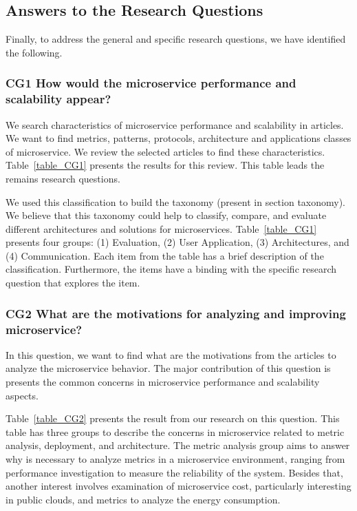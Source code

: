 \subsection{Answers to the Research Questions}

Finally, to address the general and specific research questions, we have identified the following.

\subsubsection{CG1 How would the microservice performance and scalability appear?}

We search characteristics of microservice performance and scalability in articles. We want to find metrics, patterns, protocols, architecture and applications classes of microservice. We review the selected articles to find these characteristics. Table~\ref{table_CG1} presents the results for this review. This table leads the remains research questions.

We used this classification to build the taxonomy (present in section taxonomy). We believe that this taxonomy could help to classify, compare, and evaluate different architectures and solutions for microservices. Table~\ref{table_CG1} presents four groups: (1) Evaluation, (2) User Application, (3) Architectures, and (4) Communication. Each item from the table has a brief description of the classification. Furthermore, the items have a binding with the specific research question that explores the item.

\subsubsection{CG2 What are the motivations for analyzing and improving microservice?}

In this question, we want to find what are the motivations from the articles to analyze the microservice behavior. The major contribution of this question is presents the common concerns in microservice performance and scalability aspects. 

Table~\ref{table_CG2} presents the result from our research on this question. This table has three groups to describe the concerns in microservice related to metric analysis, deployment, and architecture. 
The metric analysis group aims to answer why is necessary to analyze metrics in a microservice environment, ranging from performance investigation to measure the reliability of the system. Besides that, another interest involves examination of microservice cost, particularly interesting in public clouds, and metrics to analyze the energy consumption.

